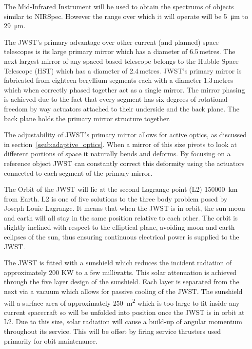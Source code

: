 	The Mid-Infrared Instrument will be used to obtain the spectrums of objects similar to NIRSpec. However the range over which it will operate will be \SI{5}{\micro\metre} to \SI{29}{\micro\metre}.

	The JWST’s primary advantage over other current (and planned) space telescopes is its large primary mirror which has a diameter of 6.5\,metres. The next largest mirror of any spaced based telescope belongs to the Hubble Space Telescope (HST) which has a diameter of 2.4\,metres. JWST’s primary mirror is fabricated from eighteen beryllium segments each with a diameter 1.3\,metres which when correctly phased together act as a single mirror. The mirror phasing is achieved due to the fact that every segment has six degrees of rotational freedom by way actuators attached to their underside and the back plane. The back plane holds the primary mirror structure together.

	The adjustability of JWST’s primary mirror allows for active optics, as discussed in section~\ref{ssub:adaptive_optics}. When a mirror of this size pivots to look at different portions of space it naturally bends and deforms. By focusing on a reference object JWST can constantly correct this deformity using the actuators connected to each segment of the primary mirror.

	The Orbit of the JWST will lie at the second Lagrange point (L2) \SI{150000}{\kilo\metre} from Earth. L2 is one of five solutions to the three body problem posed by Joseph Louie Lagrange. It means that when the JWST is in orbit, the sun moon and earth will all stay in the same position relative to each other. The orbit is slightly inclined with respect to the elliptical plane, avoiding moon and earth eclipses of the sun, thus ensuring continuous electrical power is supplied to the JWST.

	The JWST is fitted with a sunshield which reduces the incident radiation of approximately 200 KW to a few milliwatts. This solar attenuation is achieved through the five layer design of the sunshield. Each layer is separated from the next via a vacuum which allows for passive cooling of the JWST. The sunshield will a surface area of approximately \SI{250}{\square\metre} which is too large to fit inside any current spacecraft so will be unfolded into position once the JWST is in orbit at L2. Due to this size, solar radiation will cause a build-up of angular momentum throughout its service. This will be offset by firing service thrusters used primarily for obit maintenance.

